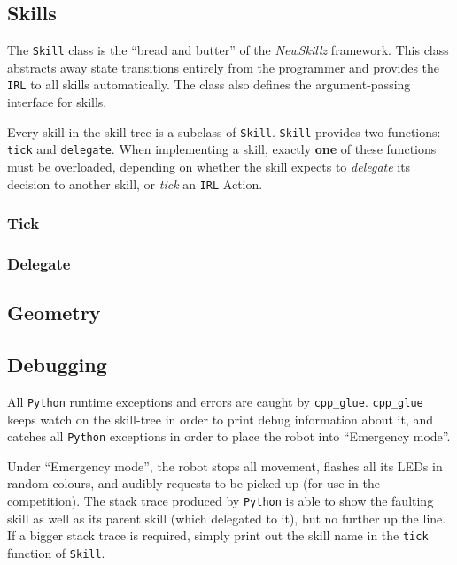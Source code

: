 \subsection{Skills}

The \texttt{Skill} class is the ``bread and butter'' of the \textit{NewSkillz} framework. This class abstracts away state transitions entirely from the programmer and provides the \texttt{IRL} to all skills automatically. The class also defines the argument-passing interface for skills.

Every skill in the skill tree is a subclass of \texttt{Skill}. \texttt{Skill} provides two functions: \texttt{tick} and \texttt{delegate}. When implementing a skill, exactly \textbf{one} of these functions must be overloaded, depending on whether the skill expects to \textit{delegate} its decision to another skill, or \textit{tick} an \texttt{IRL} Action.

\subsubsection{Tick}

\subsubsection{Delegate}

\subsection{Geometry}

\subsection{Debugging} 

All \verb!Python! runtime exceptions and errors are caught by \texttt{cpp\_glue}. \texttt{cpp\_glue} keeps watch on the skill-tree in order to print debug information about it, and catches all \verb!Python! exceptions in order to place the robot into ``Emergency mode''.

Under ``Emergency mode'', the robot stops all movement, flashes all its LEDs in random colours, and audibly requests to be picked up (for use in the competition). The stack trace produced by \verb!Python! is able to show the faulting skill as well as its parent skill (which delegated to it), but no further up the line. If a bigger stack trace is required, simply print out the skill name in the \texttt{tick} function of \texttt{Skill}.

